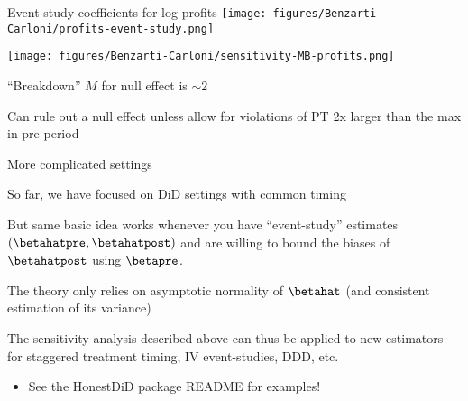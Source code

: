 \documentclass[aspectratio = 169, 13pt]{beamer}
\begin{document}
\begin{frame}{Event-study coefficients for log profits}
	\centering
	\texttt{[image: figures/Benzarti-Carloni/profits-event-study.png]}
\end{frame}

\begin{frame}
	\begin{minipage}{0.5 \linewidth}
		
		{\centering
			\texttt{[image: figures/Benzarti-Carloni/sensitivity-MB-profits.png]}}
	\end{minipage}%
	\begin{minipage}{0.5 \linewidth}
		\begin{wideitemize}
			\item
			``Breakdown'' $\bar{M}$ for null effect is $\sim 2$
			
			\item
			Can rule out a null effect unless allow for violations of PT 2x larger than the max in pre-period
			
		\end{wideitemize}
	\end{minipage}	
	
\end{frame}

\begin{frame}{More complicated settings}
	\begin{wideitemize}
		\item
		So far, we have focused on DiD settings with common timing
		
		\item
		But same basic idea works whenever you have ``event-study'' estimates $(\betahatpre, \betahatpost)$ and are willing to bound the biases of $\betahatpost$ using $\betapre$.
		
		\item
		The theory only relies on asymptotic normality of $\betahat$ (and consistent estimation of its variance)
		
		\item
		The sensitivity analysis described above can thus be applied to new estimators for staggered treatment timing, IV event-studies, DDD, etc.
		\begin{itemize}
			\item 
			See the HonestDiD package README for examples!
		\end{itemize}	
	\end{wideitemize}	
\end{frame}
\end{document}
